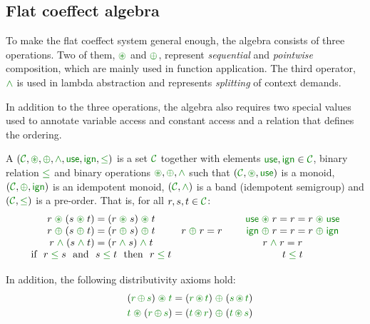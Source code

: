 
\subsection{Flat coeffect algebra}
\label{sec:flat-calculus-algebra}

To make the flat coeffect system general enough, the algebra consists of three operations.
Two of them, $\cseq$ and $\cpar$, represent \emph{sequential} and \emph{pointwise} composition,
which are mainly used in function application. The third operator, $\czip$ is used in lambda
abstraction and represents \emph{splitting} of context demands.

In addition to the three operations, the algebra also requires two special values used to annotate
variable access and constant access and a relation that defines the ordering.

\begin{definition}
A \emph{} $(\C, \cseq, \cpar, \czip, \cunit, \czero, \cleq)$ is a set
$\C$ together with elements $\cunit, \czero \in \C$, binary relation $\cleq$ and binary operations
$\cseq, \cpar, \czip$ such that $(\C, \cseq, \cunit)$ is a monoid, $(\C, \cpar, \czero)$ is an
idempotent monoid, $(\C, \czip)$ is a band (idempotent semigroup) and $(\C, \cleq)$ is a pre-order.
That is, for all $r,s,t\in \C$:
%
\begin{equation*}
\begin{array}{ccc}
r \;\cseq\; (s \;\cseq\; t) = (r \;\cseq\; s) \;\cseq\; t &&
\cunit \;\cseq\; r = r = r \;\cseq\; \cunit
\\
r \;\cpar\; (s \;\cpar\; t) = (r \;\cpar\; s) \;\cpar\; t &
r\; \cpar\; r = r~~~~&
\czero \;\cpar\; r = r = r \;\cpar\; \czero
\\
r \;\czip\; (s \;\czip\; t) = (r \;\czip\; s) \;\czip\; t &&
r\; \czip\; r = r \qquad
\\
\textnormal{if}~~r\; \cleq\; s ~~\textnormal{and}~~s\; \cleq\; t~~\textnormal{then}~~r\; \cleq\; t &&
t\; \cleq\; t \\[0.5em]
\end{array}
\end{equation*}
%
In addition, the following distributivity axioms hold:
\begin{align*}
\quad (\cclrd{r}\, \cpar\, \cclrd{s}) \;\cseq\; \cclrd{t} & = (\cclrd{r} \,\cseq\, \cclrd{t}) \;\cpar\; (\cclrd{s}\, \cseq\, \cclrd{t}) \\
\quad \cclrd{t} \;\cseq\; (\cclrd{r}\, \cpar\, \cclrd{s}) & = (\cclrd{t} \,\cseq\, \cclrd{r}) \;\cpar\; (\cclrd{t}\, \cseq\, \cclrd{s})
\end{align*}
\end{definition}

